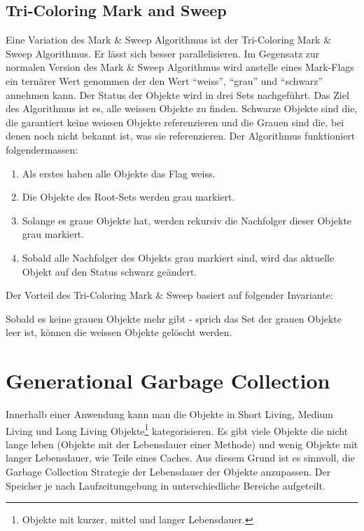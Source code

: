\subsection{Tri-Coloring Mark and Sweep}\label{tri-coloring mark and sweep}
Eine Variation des Mark \& Sweep Algorithmus ist der Tri-Coloring Mark \& Sweep Algorithmus. Er lässt sich besser parallelisieren\cite[S. 79]{lagergren2010oracle}. Im Gegensatz zur normalen Version des Mark \& Sweep Algorithmus wird anstelle eines Mark-Flags ein ternärer Wert genommen der den Wert ``weiss'', ``grau'' und ``schwarz'' annehmen kann. Der Status der Objekte wird in drei Sets nachgeführt. Das Ziel des Algorithmus ist es, alle weissen Objekte zu finden. Schwarze Objekte sind die, die garantiert keine weissen Objekte referenzieren und die Grauen sind die, bei denen noch nicht bekannt ist, was sie referenzieren. Der Algorithmus funktioniert folgendermassen:

\begin{enumerate}
	\item Als erstes haben alle Objekte das Flag weiss.
	\item Die Objekte des Root-Sets werden grau markiert.
	\item Solange es graue Objekte hat, werden rekursiv die Nachfolger dieser Objekte grau markiert.
	\item Sobald alle Nachfolger des Objekts grau markiert sind, wird das aktuelle Objekt auf den Status schwarz geändert.
\end{enumerate}

Der Vorteil des Tri-Coloring Mark \& Sweep basiert auf folgender Invariante:
\begin{center}
\end{center}
Sobald es keine grauen Objekte mehr gibt - sprich das Set der grauen Objekte leer ist, können die weissen Objekte gelöscht werden.

\section{Generational Garbage Collection}\label{generational gc}
Innerhalb einer Anwendung kann man die Objekte in Short Living, Medium Living und Long Living Objekte\footnote{Objekte mit kurzer, mittel und langer Lebensdauer.} kategorisieren. Es gibt viele Objekte die nicht lange leben (Objekte mit der Lebensdauer einer Methode) und wenig Objekte mit langer Lebensdauer, wie Teile eines Caches. Aus diesem Grund ist es sinnvoll, die Garbage Collection Strategie der Lebensdauer der Objekte anzupassen. Der Speicher je nach Laufzeitumgebung in unterschiedliche Bereiche aufgeteilt.
